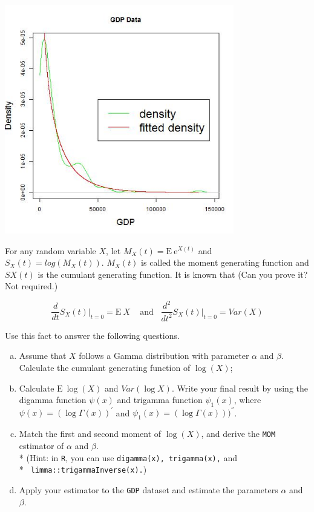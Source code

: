 \documentclass[12pt]{article}
\newenvironment{question}[2][Question]{\begin{trivlist}
\item[\hskip \labelsep {\bfseries #1}\hskip \labelsep {\bfseries #2.}]}{\end{trivlist}}
\begin{document}
\begin{enumerate}[(a)]
\begin{center}
\includegraphics[width=10cm, height=10cm]{gdpfit}
\end{center}

\end{enumerate}

\bigskip
\bigskip
\begin{question}{3.4}For any random variable $X$, let $M_X(t) = \mathrm{E} \: \mathrm{e}^{X(t)}$ and $S_X(t) = log(M_X(t))$. $M_X(t)$ is called 
the moment generating function and $SX(t)$ is the cumulant generating function. It is known that (Can you prove it? Not required.)

\begin{center}
$$
\frac{d}{dt} S_X(t) \Big|_{t=0} = \mathrm{E} \: X \;\;\; \text{ and} \;\;\; \frac{d^2}{dt^2} S_X(t) \Big|_{t=0} = Var(X) 
$$
\end{center}

Use this fact to answer the following questions.

\begin{enumerate}[(a)]

   \item Assume that $X$ follows a Gamma distribution with parameter $\alpha$ and $\beta$. Calculate the cumulant generating function of $\log (X)$;
   \item Calculate $ \mathrm{E} \: \log (X)$  and $Var(\log X)$. Write your final result by using the digamma function  $\psi (x) $
and trigamma function  $\psi_1 (x) $, where  $\psi (x) = (\log \Gamma(x))^{'}$ and  $\psi_1 (x) = (\log \Gamma(x)))^{''}$.
   \item Match the first and second moment of $\log(X)$, and derive the \texttt{MOM} estimator of $\alpha$ and $\beta$. \\*
(Hint: in \texttt{R}, you can use \texttt{digamma(x), trigamma(x),} and \\* \texttt{ limma::trigammaInverse(x).})

   \item Apply your estimator to the \texttt{GDP} dataset and estimate the parameters $\alpha$  and $\beta$.


\end{enumerate}


\end{question}
\end{document}
